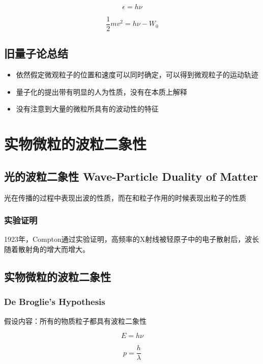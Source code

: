 \documentclass[a4paper]{ctexrep}
\begin{document}
    \[
        \epsilon = h\nu
    \]
        
    \[         
        \frac{1}{2} mv^2 = h\nu - W_0    
    \]

    \subsection{旧量子论总结}

    \begin{itemize}
        \item 依然假定微观粒子的位置和速度可以同时确定，可以得到微观粒子的运动轨迹
        \item 量子化的提出带有明显的人为性质，没有在本质上解释
        \item 没有注意到大量的微粒所具有的波动性的特征
    \end{itemize}


    \section{实物微粒的波粒二象性}

    \subsection{光的波粒二象性 Wave-Particle Duality of Matter}

    光在传播的过程中表现出波的性质，而在和粒子作用的时候表现出粒子的性质

    \subsubsection{实验证明}

    1923年，Compton通过实验证明，高频率的X射线被轻原子中的电子散射后，波长随着散射角的增大而增大。

    \subsection{实物微粒的波粒二象性}

    \subsubsection{De Broglie's Hypothesis}

    假设内容：所有的物质粒子都具有波粒二象性

    \[ 
        E = h\nu 
    \] 

    \[ 
        p = \frac{h}{\lambda}
    \]
\end{document}
